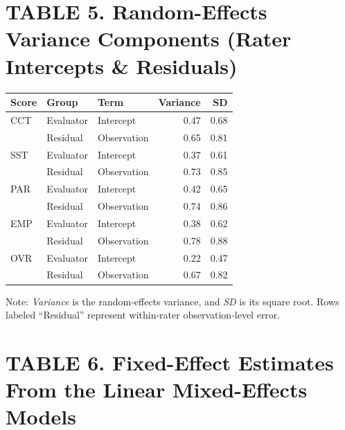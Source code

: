 \documentclass{wiley-article}
\begin{document}
\begin{table}[htbp] %
  \section*{TABLE 5. Random-Effects Variance Components (Rater Intercepts \& Residuals)}
  \centering
  \footnotesize
  \begin{threeparttable}
    \label{tab:random_effects}
    \begin{tabular}{lllr r}
      \toprule
      \textbf{Score} & \textbf{Group} & \textbf{Term} & \textbf{Variance} & \textbf{SD} \\
      \midrule
      CCT & Evaluator & Intercept   & 0.47 & 0.68 \\
          & Residual  & Observation & 0.65 & 0.81 \\
      \addlinespace
      SST & Evaluator & Intercept   & 0.37 & 0.61 \\
          & Residual  & Observation & 0.73 & 0.85 \\
      \addlinespace
      PAR & Evaluator & Intercept   & 0.42 & 0.65 \\
          & Residual  & Observation & 0.74 & 0.86 \\
      \addlinespace
      EMP & Evaluator & Intercept   & 0.38 & 0.62 \\
          & Residual  & Observation & 0.78 & 0.88 \\
      \addlinespace
      OVR & Evaluator & Intercept   & 0.22 & 0.47 \\
          & Residual  & Observation & 0.67 & 0.82 \\
      \bottomrule
    \end{tabular}
    \begin{tablenotes}
      \scriptsize
      \item Note: \textit{Variance} is the random‐effects variance, and \textit{SD} is its square root. Rows labeled “Residual” represent within‐rater observation‐level error.
    \end{tablenotes}
  \end{threeparttable}
\end{table}



\section*{TABLE 6. Fixed-Effect Estimates From the Linear Mixed-Effects Models}
\end{document}
